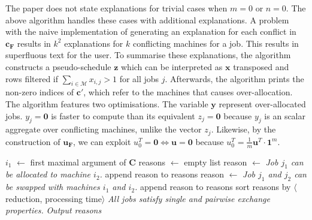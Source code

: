 The paper \cite{aes} does not state explanations for trivial cases when $m=0$ or $n=0$. The above algorithm handles these cases with additional explanations. A problem with the naive implementation of generating an explanation for each conflict in $\mathbf{c_F}$ results in $k^2$ explanations for $k$ conflicting machines for a job. This results in superfluous text for the user. To summarise these explanations, the algorithm constructs a pseudo-schedule $\mathbf{z}$ which can be interpreted as $\mathbf{x}$ transposed and rows filtered if $\sum_{i\in\mathcal{M}}x_{i,j}>1$ for all jobs $j$. Afterwards, the algorithm prints the non-zero indices of $\mathbf{c}'$, which refer to the machines that causes over-allocation.
\linespace
The algorithm features two optimisations. The variable $\mathbf{y}$ represent over-allocated jobs. $y_j=\mathbf{0}$ is faster to compute than its equivalent $z_j=\mathbf{0}$ because $y_j$ is an scalar aggregate over conflicting machines, unlike the vector $z_j$. Likewise, by the construction of $\mathbf{u_F}$, we can exploit $u^T_0=\mathbf{0}\iff\mathbf{u}=\mathbf{0}$ because $u^T_0=\frac{1}{m}\mathbf{u}^T\cdot\mathbf{1}^m$.

\begin{algorithm}[H]
	\caption{}
	\begin{algorithmic}[1]
			\State $i_1$ $\gets$ first maximal argument of $\mathbf{C}$
			\State reasons $\gets$ empty list
					\State reason $\gets$ \emph{Job $j_1$ can be allocated to machine $i_2$.}
					\State append reason to reasons
				\EndIf
						\State reason $\gets$ \emph{Job $j_1$ and $j_2$ can be swapped with machines $i_1$ and $i_2$.}
						\State append reason to reasons
					\EndIf
				\EndFor
			\EndFor
			\State sort reasons by $\langle$reduction, processing time$\rangle$
				\State\emph{All jobs satisfy single and pairwise exchange properties.}
			\Else
				\State\emph{Output reasons}
			\EndIf
		\EndFunction
	\end{algorithmic}
\end{algorithm}

